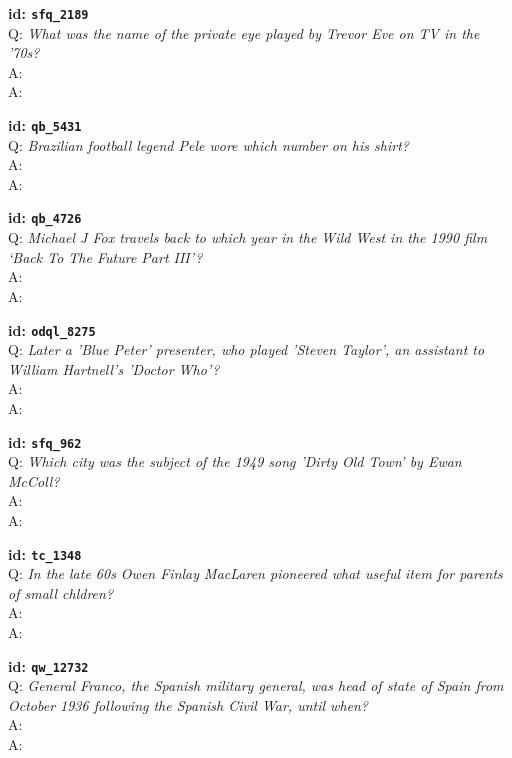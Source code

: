 \tiny{\setlength{\parindent}{0cm}
\textbf{id: \texttt{sfq\_2189}} \\
Q: \textit{What was the name of the private eye played by Trevor Eve on TV in the '70s?} \\
A:  \\
A: }

\tiny{\setlength{\parindent}{0cm}
\textbf{id: \texttt{qb\_5431}} \\
Q: \textit{Brazilian football legend Pele wore which number on his shirt?} \\
A:  \\
A: }

\tiny{\setlength{\parindent}{0cm}
\textbf{id: \texttt{qb\_4726}} \\
Q: \textit{Michael J Fox travels back to which year in the Wild West in the 1990 film ‘Back To The Future Part III’?} \\
A:  \\
A: }

\tiny{\setlength{\parindent}{0cm}
\textbf{id: \texttt{odql\_8275}} \\
Q: \textit{Later a 'Blue Peter' presenter, who played 'Steven Taylor', an assistant to William Hartnell's 'Doctor Who'?} \\
A:  \\
A: }

\tiny{\setlength{\parindent}{0cm}
\textbf{id: \texttt{sfq\_962}} \\
Q: \textit{Which city was the subject of the 1949 song 'Dirty Old Town' by Ewan McColl?} \\
A:  \\
A: }

\tiny{\setlength{\parindent}{0cm}
\textbf{id: \texttt{tc\_1348}} \\
Q: \textit{In the late 60s Owen Finlay MacLaren pioneered what useful item for parents of small chldren?} \\
A:  \\
A: }

\tiny{\setlength{\parindent}{0cm}
\textbf{id: \texttt{qw\_12732}} \\
Q: \textit{General Franco, the Spanish military general, was head of state of Spain from October 1936 following the Spanish Civil War, until when?} \\
A:  \\
A: }


